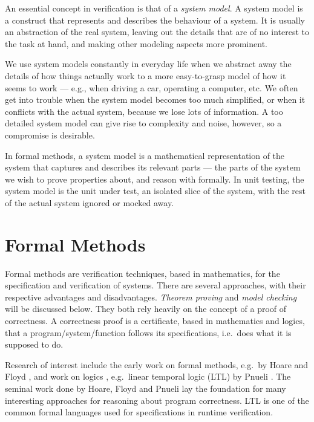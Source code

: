 An essential concept in verification is that of a \textit{system model}. A
system model is a construct that represents and describes the behaviour of a
system. It is usually an abstraction of the real system, leaving out the
details that are of no interest to the task at hand, and making other modeling
aspects more prominent.

We use system models constantly in everyday life when we abstract away the
details of how things actually work to a more easy-to-grasp model of how it
seems to work --- e.g., when driving a car, operating a computer, etc. We often
get into trouble when the system model becomes too much simplified, or when it
conflicts with the actual system, because we lose lots of information. A too
detailed system model can give rise to complexity and noise, however, so a
compromise is desirable.

In formal methods, a system model is a mathematical representation of the
system that captures and describes its relevant parts --- the parts of the
system we wish to prove properties about, and reason with formally. In unit
testing, the system model is the unit under test, an isolated slice of the
system, with the rest of the actual system ignored or mocked away.


\section{Formal Methods} \label{section-formal-methods}

Formal methods are verification techniques, based in mathematics, for the
specification and verification of systems. There are several approaches, with
their respective advantages and disadvantages. \textit{Theorem proving} and
\textit{model checking} will be discussed below. They both rely heavily on the
concept of a proof of correctness. A correctness proof is a certificate, based
in mathematics and logics, that a program/system/function follows its
specifications, i.e.\ does what it is supposed to do.

Research of interest include the early work on formal methods, e.g.\ by Hoare
\cite{hoare69} and Floyd \cite{floyd67}, and work on logics , e.g.\ linear
temporal logic (LTL) by Pnueli \cite{pnueli77}. The seminal work done by Hoare,
Floyd and Pnueli lay the foundation for many interesting approaches for
reasoning about program correctness. LTL is one of the common formal languages
used for specifications in runtime verification.

